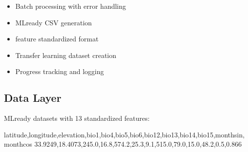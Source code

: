 \documentclass[letterpaper,10pt,english]{sphinxmanual}
\begin{document}
\begin{description}
\begin{itemize}
\item {} 
\sphinxAtStartPar
Batch processing with error handling

\end{itemize}

\begin{itemize}
\item {} 
\sphinxAtStartPar
ML\sphinxhyphen{}ready CSV generation

\item {} 
\sphinxhyphen{}feature standardized format

\item {} 
\sphinxAtStartPar
Transfer learning dataset creation

\item {} 
\sphinxAtStartPar
Progress tracking and logging

\end{itemize}

\end{description}


\subsection{Data Layer}
\label{\detokenize{architecture:data-layer}}
\sphinxAtStartPar
{}

\sphinxAtStartPar
ML\sphinxhyphen{}ready datasets with 13 standardized features:

\begin{sphinxVerbatim}[commandchars=\\\{\}]
latitude,longitude,elevation,bio1,bio4,bio5,bio6,bio12,bio13,bio14,bio15,month\PYGZus{}sin,month\PYGZus{}cos
\PYGZhy{}33.9249,18.4073,245.0,16.8,574.2,25.3,9.1,515.0,79.0,15.0,48.2,0.5,0.866
\end{sphinxVerbatim}
\end{document}
